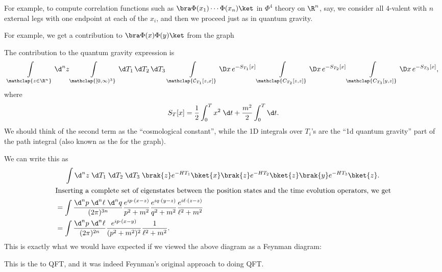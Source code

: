\documentclass[a4paper]{article}
\begin{document}
For example, to compute correlation functions such as $\bra \Phi(x_1) \cdots \Phi(x_n)\ket$ in $\Phi^4$ theory on $\R^n$, say, we consider all $4$-valent with $n$ external legs with one endpoint at each of the $x_i$, and then we proceed just as in quantum gravity.

For example, we get a contribution to $\bra \Phi(x) \Phi(y)\ket$ from the graph
\begin{center}
\end{center}
The contribution to the quantum gravity expression is
\begin{multline*}
  \int\limits_{\mathclap{z \in \R^n}}\d^n z \int\limits_{\mathclap{[0, \infty)^3}} \d T_1\, \d T_2\, \d T_3\, \int\limits_{\mathclap{\mathcal{C}_{T_1}[z, x]}} \D x\, e^{-S_{T_1}[x]} \int\limits_{\mathclap{C_{T_2}[z, z]}} \D x\, e^{-S_{T_2}[x]} \int\limits_{\mathclap{C_{T_3}[y, z]}} \D x\, e^{-S_{T_3}[x]},
\end{multline*}
where
\[
  S_T[x] = \frac{1}{2} \int_0^T x^2 \;\d t + \frac{m^2}{2}\int_0^T \d t.
\]
We should think of the second term as the ``cosmological constant'', while the 1D integrals over $T_i$'s are the ``1d quantum gravity'' part of the path integral (also known as the  for the graph).

We can write this as
\begin{align*}
  &\hphantom{{}={}} \int \d^n z \; \d T_1 \;\d T_2 \;\d T_3\; \brak{z} e^{-HT_1} \bket{x} \brak{z}e^{-HT_2} \bket{z} \brak{y} e^{-H T_3} \bket{z}.\\
  \intertext{Inserting a complete set of eigenstates between the position states and the time evolution operators, we get}
  &= \int \frac{\d^n p\; \d^n \ell\;\d^n q}{(2\pi)^{3n}} \frac{e^{ip\cdot(x - z)}}{p^2 + m^2} \frac{e^{iq\cdot(y - z)}}{q^2 + m^2} \frac{e^{i\ell\cdot(z - z)}}{\ell^2 + m^2}\\
  &= \int \frac{\d^n p\; \d^n \ell}{(2\pi)^{2n}} \frac{e^{ip\cdot (x - y)}}{(p^2 + m^2)^2} \frac{1}{\ell^2 + m^2}.
\end{align*}
This is exactly what we would have expected if we viewed the above diagram as a Feynman diagram:
\begin{center}
\end{center}
This is the  to QFT, and it was indeed Feynman's original approach to doing QFT.
\end{document}
